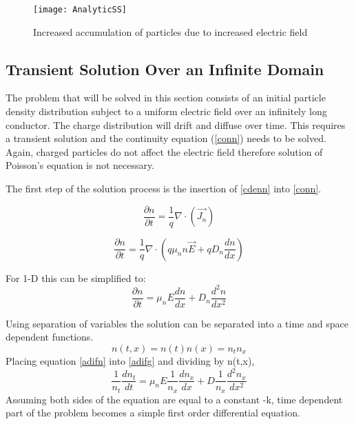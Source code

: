 \begin{doublespace}
\begin{figure}[!htp]
\centering
\texttt{[image: AnalyticSS]}
\caption{Increased accumulation of particles due to increased electric field} 
\end{figure}


\clearpage
\subsection{Transient Solution Over an Infinite Domain}

The problem that will be solved in this section consists of an initial particle density distribution subject to a uniform electric field over an infinitely long conductor. The charge distribution will drift and diffuse over time. This requires a transient solution and the continuity equation (\ref{conn}) needs to be solved. Again, charged particles do not affect the electric field therefore solution of Poisson's equation is not necessary. 

The first step of the solution process is the insertion of \eqref{cdenn} into \eqref{conn}.

\begin{equation}
\frac{\partial n}{\partial t} = \frac{1}{q}\nabla \cdot (\vec{J_n})
\end{equation}


\begin{equation}
\frac{\partial n}{\partial t} = \frac{1}{q}\nabla \cdot (q \mu_{n} n \vec{E}+qD_{n} \frac{dn}{dx} )
\end{equation}

For 1-D this can be simplified to:
\begin{equation}
\frac{\partial n}{\partial t} = \mu_n E \frac{d n}{d x}+D_{n}\frac{d^{2}n}{dx^{2}}
\label{adifg}
\end{equation}

Using separation of variables the solution can be separated into a time and space dependent functions.
\begin{equation}
n(t,x)=n(t)n(x)=n_t n_x
\label{adifn}
\end{equation}
Placing equation \eqref{adifn} into \eqref{adifg} and dividing by n(t,x),
\begin{equation}
\frac{1}{n_{t}}\frac{d n_{t}}{d t}=\mu_n E \frac{1}{n_{x}}\frac{d n_{x}}{dx}+D\frac{1}{n_{x}}\frac{d^2 n_{x}}{dx^2}
\label{Adif}
\end{equation}
Assuming both sides of the equation are equal to a constant -k, time dependent part of the problem becomes a simple first order differential equation.


\end{doublespace}
